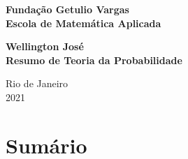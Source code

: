 \documentclass[12pt]{article}
\begin{document}
\begin{titlepage}
\begin{center}
\textbf{\LARGE Fundação Getulio Vargas}\\ 
\textbf{\LARGE Escola de Matemática Aplicada}

\par
\vspace{170pt}
\textbf{\Large Wellington José}\\
\vspace{32pt}
\textbf{\Large Resumo de Teoria da Probabilidade}\\
\end{center}

\par
\vfill
\begin{center}
{{\normalsize Rio de Janeiro}\\
{\normalsize 2021}}
\end{center}
\end{titlepage}

\section*{Sumário}

\textbf{}
\vspace{3mm}

\textbf{}
\vspace{3mm}

\textbf{}
\vspace{3mm} \\
\textbf{}
\vspace{3mm}

\textbf{}
\vspace{3mm}

\textbf{}
\vspace{3mm}

\textbf{}
\vspace{3mm}

\textbf{}
\vspace{3mm}

\textbf{}
\vspace{3mm} \\
\textbf{}
\vspace{3mm}

\textbf{}
\vspace{3mm}

\textbf{}
\vspace{3mm}
\end{document}
